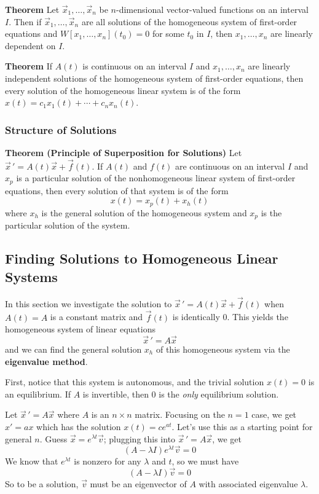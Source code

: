 \documentclass[12pt]{article}
\begin{document}
\textbf{Theorem} Let $\vec{x}_1, \ldots, \vec{x}_n$ be $n$-dimensional vector-valued functions on an interval $I$. Then if $\vec{x}_1, \ldots, \vec{x}_n$ are all solutions of the homogeneous system of first-order equations and $W[x_1, \ldots, x_n](t_0) = 0$ for some $t_0$ in $I$, then $x_1, \ldots, x_n$ are linearly dependent on $I$.

\textbf{Theorem} If $A(t)$ is continuous on an interval $I$ and $x_1, \ldots, x_n$ are linearly independent solutions of the homogeneous system of first-order equations, then every solution of the homogeneous linear system is of the form $x(t) = c_1x_1(t) + \cdots + c_nx_n(t)$.

\subsubsection{Structure of Solutions}

\textbf{Theorem (Principle of Superposition for Solutions)} Let $\vec{x} \, ' = A(t)\vec{x} + \vec{f}(t)$. If $A(t)$ and $f(t)$ are continuous on an interval $I$ and $x_p$ is a particular solution of the nonhomogeneous linear system of first-order equations, then every solution of that system is of the form $$x(t) = x_p(t) + x_h(t)$$ where $x_h$ is the general solution of the homogeneous system and $x_p$ is the particular solution of the system.

\subsection{Finding Solutions to Homogeneous Linear Systems}

In this section we investigate the solution to $\vec{x} \, ' = A(t)\vec{x} + \vec{f}(t)$ when $A(t) = A$ is a constant matrix and $\vec{f}(t)$ is identically 0. This yields the homogeneous system of linear equations $$\vec{x} \, ' = A\vec{x}$$ and we can find the general solution $x_h$ of this homogeneous system via the \textbf{eigenvalue method}.

First, notice that this system is autonomous, and  the trivial solution $x(t)=0$ is an equilibrium. If $A$ is invertible, then $0$ is the \textit{only} equilibrium solution.

Let $\vec{x}\, ' = A\vec{x}$ where $A$ is an $n \times n$ matrix. Focusing on the $n = 1$ case, we get $x' = ax$ which has the solution $x(t) = ce^{at}$. Let's use this as a starting point for general $n$. Guess $\vec{x} = e^{\lambda t}\vec{v}$; plugging this into $\vec{x} \, ' = A \vec{x}$, we get $$(A - \lambda I)e^{\lambda t}\vec{v} = 0$$ We know that $e^{\lambda t}$ is nonzero for any $\lambda$ and $t$, so we must have $$(A -  \lambda I)\vec{v} = 0$$ So to be a solution, $\vec{v}$ must be an eigenvector of $A$ with associated eigenvalue $\lambda$.
\end{document}
